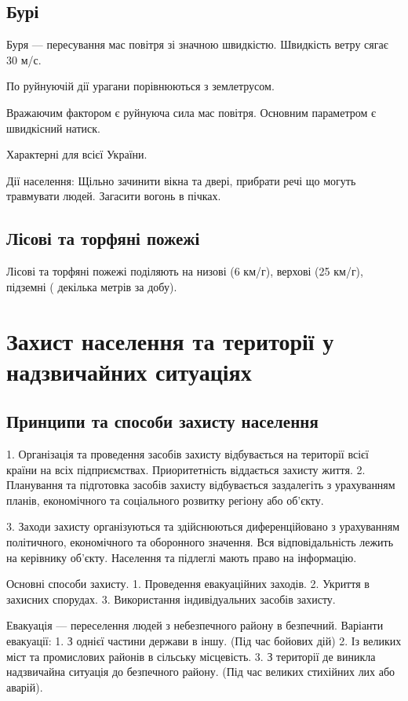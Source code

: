 \documentclass[a4paper,10pt,notitlepage,pdftex,headsepline]{scrartcl}
\begin{document}
  \subsection{Бурі}
    Буря --- пересування мас повітря зі значною швидкістю. Швидкість ветру
    сягає 30 м/с.

    По руйнуючій дії урагани порівнюються з землетрусом.

    Вражаючим фактором є руйнуюча сила мас повітря.
    Основним параметром є швидкісний натиск.

    Характерні для всієї України.

    Дії населення:
      Щільно зачинити вікна та двері, прибрати речі що могуть травмувати
      людей. Загасити вогонь в пічках.
  \subsection{Лісові та торфяні пожежі}
    Лісові та торфяні пожежі поділяють на низові (6 км/г), верхові (25 км/г),
    підземні ( декілька метрів за добу).


\section{Захист населення та території у надзвичайних ситуаціях}
  \subsection{Принципи та способи захисту населення}
    1. Організація та проведення засобів захисту відбувається на території
    всієї країни на всіх підприємствах.
    Приоритетність віддається захисту життя.
    2. Планування та підготовка засобів захисту відбувається заздалегіть з
    урахуванням планів, економічного та соціального розвитку регіону або
    об’єкту.

    3. Заходи захисту організуються та здійснюються диференційовано з
    урахуванням політичного, економічного та оборонного значення.
    Вся відповідальність лежить на керівнику об’єкту.
    Населення та підлеглі мають право на інформацію.

    Основні способи захисту.
      1. Проведення евакуаційних заходів.
      2. Укриття в захисних спорудах.
      3. Використання індивідуальних засобів захисту.

  Евакуація --- переселення людей з небезпечного району в безпечний.
  Варіанти евакуації:
    1. З однієї частини держави в іншу. (Під час бойових дій)
    2. Із великих міст та промислових районів в сільську місцевість.
    3. З території де виникла надзвичайна ситуація до безпечного району. (Під
    час великих стихійних лих або аварій).
\end{document}
